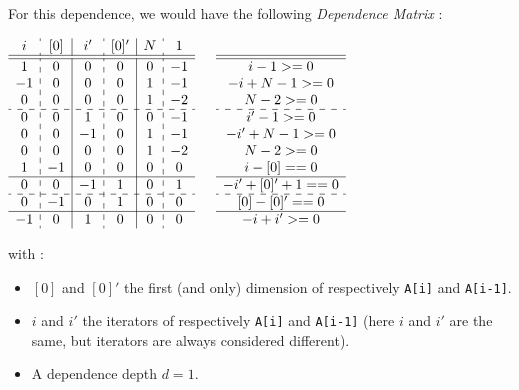 \documentclass[paper=a4, fontsize=11pt]{scrartcl}
\numberwithin{equation}{section}        %
\numberwithin{figure}{section}          %
\numberwithin{table}{section}               %
\begin{document}
        For this dependence, we would have the following \textit{Dependence Matrix} :
\begin{center}
$
        \begin{array}{c:c|c:c|c:c}
        i &    [0] & i' &   [0]' &  N &  1 \\ \hline \hline
        1 &    0 &   0 &    0 &   0 &  -1 \\
        -1 &    0 &   0 &    0 &   1 &  -1 \\
        0 &    0 &   0 &    0 &   1 &  -2 \\ \hdashline
        0 &    0 &   1 &    0 &   0 &  -1 \\
        0 &    0 &  -1 &    0 &   1 &  -1 \\
        0 &    0 &   0 &    0 &   1 &  -2 \\
        1 &   -1 &   0 &    0 &   0 &   0 \\ \hline
        0 &    0 &  -1 &    1 &   0 &   1 \\ \hdashline
        0 &   -1 &   0 &    1 &   0 &   0 \\ \hline
        -1 &    0 &   1 &    0 &   0 &   0 \\
        \end{array}
        \qquad
        \begin{matrix}
                \\ \hline \hline
        {i-1 >= 0} \\
        {-i+N-1 >= 0} \\
        {N-2 >= 0} \\ \hdashline
        {i'-1 >= 0} \\
        {-i'+N-1 >= 0} \\
        {N-2 >= 0}  \\
        {i-[0] == 0}\\ \hline
        {-i'+[0]'+1 == 0} \\ \hdashline
        {[0] - [0]' == 0}  \\ \hline
        {-i+i' >= 0} \\
        \end{matrix}
$
\end{center}
    with :
    \begin{itemize}
        \item $[0]$ and $[0]'$ the first (and only) dimension of respectively \verb'A[i]' and
            \verb'A[i-1]'.
        \item $i$ and $i'$ the iterators of respectively \verb'A[i]' and \verb'A[i-1]'
            (here $i$ and $i'$ are the same, but iterators are always considered different).
        \item A dependence depth $d = 1$.
    \end{itemize}
    
\end{document}
